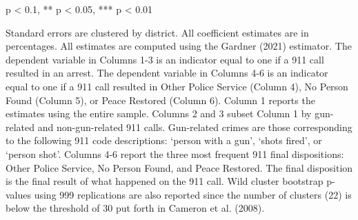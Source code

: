 \begin{table}[H]
\begin{threeparttable}
\begin{tablenotes}
\item * p < 0.1, ** p < 0.05, *** p < 0.01
\item Standard errors are clustered by district. All                      coefficient estimates are in percentages. All estimates                      are computed using the Gardner (2021) estimator.                       The dependent variable in Columns 1-3 is an indicator equal to one if a 911 call resulted in an arrest.                      The dependent variable in Columns 4-6 is an indicator equal to one if a 911 call resulted in                       Other Police Service (Column 4), No Person Found (Column 5), or Peace Restored (Column 6).                      Column 1 reports the estimates using the entire sample.                  Columns 2 and 3 subset Column 1 by gun-related and non-gun-related 911 calls.                  Gun-related crimes are those corresponding to the following                  911 code descriptions: `person with a gun',                  `shots fired', or `person shot'.                   Columns 4-6 report the three most frequent 911 final dispositions: Other Police Service, No Person Found,                   and Peace Restored. The final disposition is the final result of                  what happened on the 911 call.                   Wild cluster bootstrap p-values using 999 replications are also reported                  since the number of clusters (22) is below the threshold of 30 put forth in                  Cameron et al. (2008).                  
\end{tablenotes}
\end{threeparttable}
\end{table}
